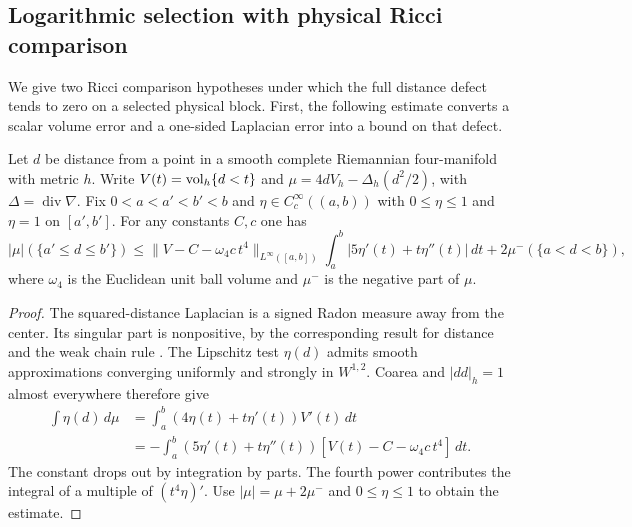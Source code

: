 \subsection{Logarithmic selection with physical Ricci comparison}
\label{subsec:physical-ricci-flux}

We give two Ricci comparison hypotheses under which the full
distance defect tends to zero on a selected physical block.
First, the following estimate converts a scalar volume error
and a one-sided Laplacian error into a bound on that defect.

\begin{lemma}\label{lem:physical-flux}
Let \(d\) be distance from a point in a smooth complete Riemannian
four-manifold with metric \(h\). Write \(V(t)=\operatorname{vol}_h\{d<t\}\) and
\(\mu=4dV_h-\Delta_h(d^2/2)\), with
\(\Delta=\operatorname{div}\nabla\). Fix \(0<a<a'<b'<b\) and
\(\eta\in C_c^\infty((a,b))\) with \(0\le\eta\le1\) and
\(\eta=1\) on \([a',b']\). For any constants \(C,c\) one has
\begin{equation}\label{eq:finite-physical-flux}
 |\mu|(\{a'\le d\le b'\})
 \le \|V-C-\omega_4c\,t^4\|_{L^\infty([a,b])}
     \int_a^b |5\eta'(t)+t\eta''(t)|\,dt
     +2\mu^-(\{a<d<b\}),
\end{equation}
where \(\omega_4\) is the Euclidean unit ball volume and
\(\mu^-\) is the negative part of \(\mu\).
\end{lemma}

\begin{proof}
The squared-distance Laplacian is a signed Radon measure
away from the center. Its singular part is nonpositive,
by the corresponding result for distance and the weak
chain rule
\cite[Corollaries~2.11--2.12]{MantegazzaMascellaniUraltsev2014DistanceHessian}.
The Lipschitz test \(\eta(d)\) admits smooth approximations
converging uniformly and strongly in \(W^{1,2}\).
Coarea and \(|dd|_h=1\) almost everywhere therefore give
\[
 \begin{aligned}
 \int\eta(d)\,d\mu
 &=\int_a^b(4\eta(t)+t\eta'(t))V'(t)\,dt\\
 &=-\int_a^b(5\eta'(t)+t\eta''(t))
          [V(t)-C-\omega_4c\,t^4]\,dt .
 \end{aligned}
\]
The constant drops out by integration by parts. The fourth
power contributes the integral of a multiple of \((t^4\eta)'\).
Use \(|\mu|=\mu+2\mu^-\) and \(0\le\eta\le1\) to obtain the estimate.
\end{proof}

